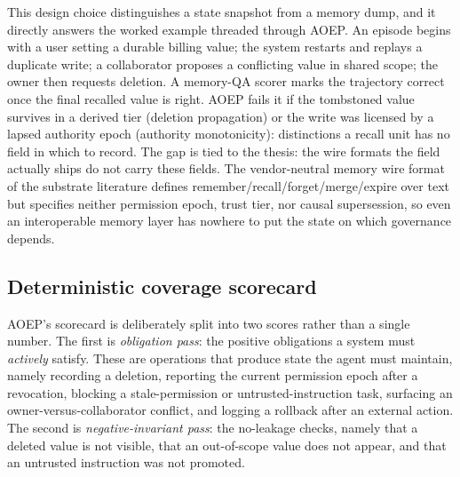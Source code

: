 This design choice distinguishes a state snapshot from a memory dump, and it directly answers the worked example threaded through AOEP. An episode begins with a user setting a durable billing value; the system restarts and replays a duplicate write; a collaborator proposes a conflicting value in shared scope; the owner then requests deletion. A memory-QA scorer marks the trajectory correct once the final recalled value is right. AOEP fails it if the tombstoned value survives in a derived tier (deletion propagation) or the write was licensed by a lapsed authority epoch (authority monotonicity): distinctions a recall unit has no field in which to record. The gap is tied to the thesis: the wire formats the field actually ships do not carry these fields. The vendor-neutral memory wire format of the substrate literature defines remember/recall/forget/merge/expire over text but specifies neither permission epoch, trust tier, nor causal supersession, so even an interoperable memory layer has nowhere to put the state on which governance depends.

\subsection{Deterministic coverage scorecard}

AOEP's scorecard is deliberately split into two scores rather than a single number. The first is \emph{obligation pass}: the positive obligations a system must \emph{actively} satisfy. These are operations that produce state the agent must maintain, namely recording a deletion, reporting the current permission epoch after a revocation, blocking a stale-permission or untrusted-instruction task, surfacing an owner-versus-collaborator conflict, and logging a rollback after an external action. The second is \emph{negative-invariant pass}: the no-leakage checks, namely that a deleted value is not visible, that an out-of-scope value does not appear, and that an untrusted instruction was not promoted.

